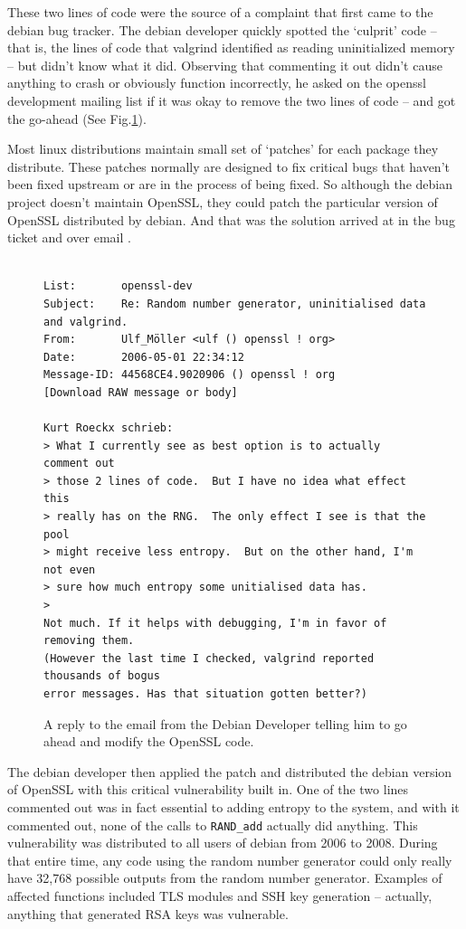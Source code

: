 \documentclass[conference]{IEEEtran}
\begin{document}
These two lines of code were the source of a complaint that first came
to the debian bug tracker\cite{2}. The debian developer quickly
spotted the `culprit' code -- that is, the lines of code that valgrind
identified as reading uninitialized memory -- but didn't know what it
did. Observing that commenting it out didn't cause anything to crash
or obviously function incorrectly, he asked on the openssl development
mailing list if it was okay to remove the two lines of code -- and got
the go-ahead (See Fig.\ref{email}).

Most linux distributions maintain small set of `patches' for each
package they distribute. These patches normally are designed to fix
critical bugs that haven't been fixed upstream or are in the process
of being fixed. So although the debian project doesn't maintain
OpenSSL, they could patch the particular version of OpenSSL
distributed by debian. And that was the solution arrived at in the bug
ticket and over email \cite{2}\cite{4}.

\begin{figure}[!t]

\centering
\begin{displayquote}
\begin{verbatim}

List:       openssl-dev
Subject:    Re: Random number generator, uninitialised data and valgrind.
From:       Ulf_Möller <ulf () openssl ! org>
Date:       2006-05-01 22:34:12
Message-ID: 44568CE4.9020906 () openssl ! org
[Download RAW message or body]

Kurt Roeckx schrieb:
> What I currently see as best option is to actually comment out
> those 2 lines of code.  But I have no idea what effect this
> really has on the RNG.  The only effect I see is that the pool
> might receive less entropy.  But on the other hand, I'm not even
> sure how much entropy some unitialised data has.
>   
Not much. If it helps with debugging, I'm in favor of removing them. 
(However the last time I checked, valgrind reported thousands of bogus 
error messages. Has that situation gotten better?)
\end{verbatim}
\end{displayquote}

\caption{A reply to the email from the Debian Developer telling him to go ahead and modify the OpenSSL code.\cite{4}}
\label{email}
\end{figure}


The debian developer then applied the patch and distributed the debian
version of OpenSSL with this critical vulnerability built in. One of
the two lines commented out was in fact essential to adding entropy to
the system, and with it commented out, none of the calls to
\verb|RAND_add| actually did anything. This vulnerability was
distributed to all users of debian from 2006 to 2008\cite{1}. During
that entire time, any code using the random number generator could
only really have 32,768 possible outputs from the random number
generator. Examples of affected functions included TLS modules and SSH
key generation -- actually, anything that generated RSA keys was
vulnerable.
\end{document}
